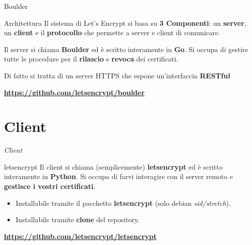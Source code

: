 \documentclass[xcolor=svgnames,11pt]{beamer}
\begin{document}
\begin{frame}{Boulder}
\begin{block}{Architettura}
Il sistema di Let's Encrypt si basa su \textbf{3 Componenti}: un \textbf{server},
un \textbf{client} e il \textbf{protocollo} che permette a server e client di comunicare.
\end{block}

\medskip \pause

Il server si chiama \textbf{Boulder} ed è scritto interamente in \textbf{Go}.
Si occupa di gestire tutte le procedure per il \textbf{rilascio} e \textbf{revoca} dei certificati.

\medskip \pause

Di fatto si tratta di un server HTTPS che espone un'interfaccia \textbf{RESTful}

\medskip \pause

\begin{center}
 \textbf{\url{https://github.com/letsencrypt/boulder}}
\end{center}
\end{frame}

\section{Client}
\begin{frame}{}
\begin{center}
\begin{Huge}
\textcolor{leorange}{\emph{Client}}
\end{Huge}
\end{center}
\end{frame}



\begin{frame}{letsencrypt}
Il client si chiama (semplicemente) \textbf{letsencrypt} ed è scritto interamente in \textbf{Python}.
Si occupa di farvi interagire con il server remoto e \textbf{gestisce i vostri certificati}.
\pause
\begin{itemize}
  \item Installabile tramite il pacchetto \textbf{letsencrypt} (solo debian \emph{sid/stretch}).
  \item Installabile tramite \textbf{clone} del repository.
\end{itemize}
\pause
\begin{center}
 \textbf{\url{https://github.com/letsencrypt/letsencrypt}}
\end{center}
\end{frame}
\end{document}
